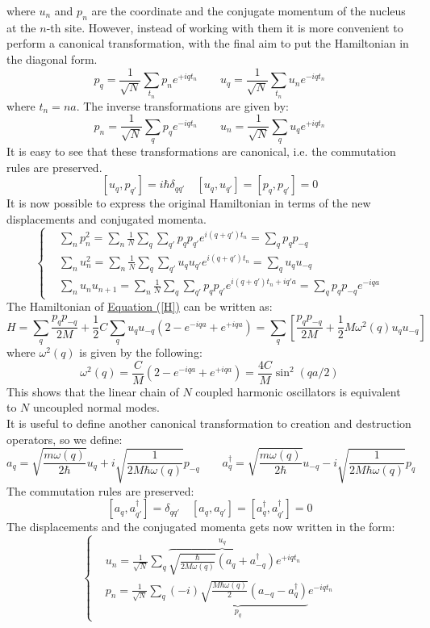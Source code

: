 \documentclass[10.75pt,a4paper,openright,bottom=2cm]{article}
\begin{document}
where $u_n$ and $p_n$ are the coordinate and the conjugate momentum of the nucleus at the $n$-th site. However, instead of working with them it is more convenient to perform a canonical transformation, with the final aim to put the Hamiltonian in the diagonal form.
\[
p_q=\frac{1}{\sqrt{N}}\sum_{t_n}p_ne^{+iqt_n} \qquad u_q=\frac{1}{\sqrt{N}}\sum_{t_n}u_ne^{-iqt_n}
\]
where $t_n=na$. The inverse transformations are given by:
\[
p_n=\frac{1}{\sqrt{N}}\sum_qp_qe^{-iqt_n} \qquad u_n=\frac{1}{\sqrt{N}}\sum_qu_qe^{+iqt_n}
\]
It is easy to see that these transformations are canonical, i.e. the commutation rules are preserved.
\[
[u_q,p_{q'}]=i\hbar\delta_{qq'} \quad [u_q,u_{q'}]=[p_q,p_{q'}]=0
\]
It is now possible to express the original Hamiltonian in terms of the new displacements and conjugated momenta.
\[
\left\{
\begin{aligned}
&\sum_np_n^2=\sum_n\frac{1}{N}\sum_q\sum_{q'}p_qp_{q'}e^{i(q+q')t_n}=\sum_qp_qp_{-q}\\
&\sum_nu_n^2=\sum_n\frac{1}{N}\sum_q\sum_{q'}u_qu_{q'}e^{i(q+q')t_n}=\sum_qu_qu_{-q}\\
&\sum_nu_nu_{n+1}=\sum_n\frac{1}{N}\sum_q\sum_{q'}p_qp_{q'}e^{i(q+q')t_n+iq'a}=\sum_qp_qp_{-q}e^{-iqa}
\end{aligned}
\right.
\]
The Hamiltonian of \hyperref[H]{Equation (\ref{H})} can be written as:
\begin{equation}
\label{H1}
H=\sum_q\frac{p_qp_{-q}}{2M}+\frac{1}{2}C\sum_qu_qu_{-q}(2-e^{-iqa}+e^{+iqa})=\sum_q\left[\frac{p_qp_{-q}}{2M}+\frac{1}{2}M\omega^2(q)u_qu_{-q}\right]
\end{equation}
where $\omega^2(q)$ is given by the following:
\[
\omega^2(q)=\frac{C}{M}(2-e^{-iqa}+e^{+iqa})=\frac{4C}{M}\sin^2(qa/2)
\]
This shows that the linear chain of $N$ coupled harmonic oscillators is equivalent to $N$ uncoupled normal modes.\\
It is useful to define another canonical transformation to creation and destruction operators, so we define:
\[
a_q=\sqrt{\frac{m\omega(q)}{2\hbar}}u_q+i\sqrt{\frac{1}{2M\hbar\omega(q)}}p_{-q} \qquad a_q^\dagger=\sqrt{\frac{m\omega(q)}{2\hbar}}u_{-q}-i\sqrt{\frac{1}{2M\hbar\omega(q)}}p_q
\]
The commutation rules are preserved:
\[
[a_q,a_{q'}^\dagger]=\delta_{qq'} \quad [a_q,a_{q'}]=[a_q^\dagger,a_{q'}^\dagger]=0
\]
The displacements and the conjugated momenta gets now written in the form:
\[
\left\{
\begin{aligned}
&u_n=\frac{1}{\sqrt{N}}\sum_q\overbrace{\sqrt{\frac{\hbar}{2M\omega(q)}}(a_q+a_{-q}^\dagger)}^{u_q}e^{+iqt_n}\\
&p_n=\frac{1}{\sqrt{N}}\sum_q\underbrace{(-i)\sqrt{\frac{M\hbar\omega(q)}{2}}(a_{-q}-a_q^\dagger)}_{p_q}e^{-iqt_n}
\end{aligned}
\right.
\]
\end{document}
